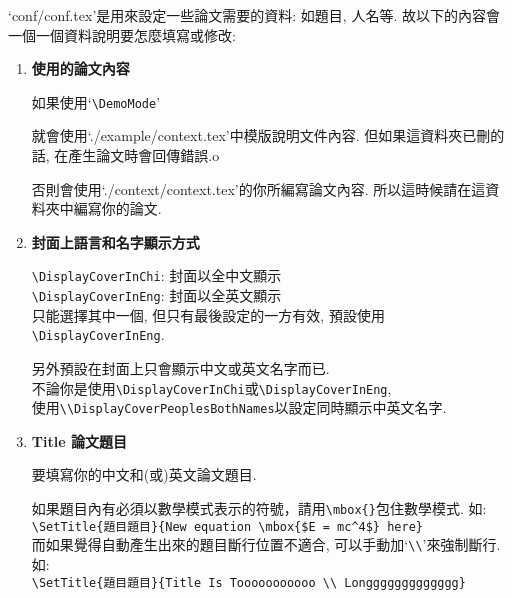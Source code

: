 
`conf/conf.tex'是用來設定一些論文需要的資料: 如題目, 人名等. 故以下的內容會一個一個資料說明要怎麼填寫或修改:

\begin{enumerate}
  \item
  {
    \textbf{使用的論文內容}

    如果使用`\verb|\DemoMode|'

    就會使用`./example/context.tex'中模版說明文件內容. 但如果這資料夾已刪的話, 在產生論文時會回傳錯誤.o

    否則會使用`./context/context.tex'的你所編寫論文內容. 所以這時候請在這資料夾中編寫你的論文.
  } %

  \item
  {
    \textbf{封面上語言和名字顯示方式}

    \verb|\DisplayCoverInChi|:  封面以全中文顯示\\
    \verb|\DisplayCoverInEng|:  封面以全英文顯示\\
    只能選擇其中一個, 但只有最後設定的一方有效, 預設使用\verb|\DisplayCoverInEng|.

    另外預設在封面上只會顯示中文或英文名字而已.\\
    不論你是使用\verb|\DisplayCoverInChi|或\verb|\DisplayCoverInEng|,\\
    使用\verb|\\DisplayCoverPeoplesBothNames|以設定同時顯示中英文名字.
  } %

  \item
  {
    \textbf{Title 論文題目}

    要填寫你的中文和(或)英文論文題目.

    如果題目內有必須以數學模式表示的符號，請用\verb|\mbox{}|包住數學模式. 如:\\
    \verb|\SetTitle{題目題目}{New equation \mbox{$E = mc^4$} here}|\\

    而如果覺得自動產生出來的題目斷行位置不適合, 可以手動加`\verb|\\|'來強制斷行. 如:\\
    \verb|\SetTitle{題目題目}{Title Is Tooooooooooo \\ Longgggggggggggg}|\\

}
\end{enumerate}
